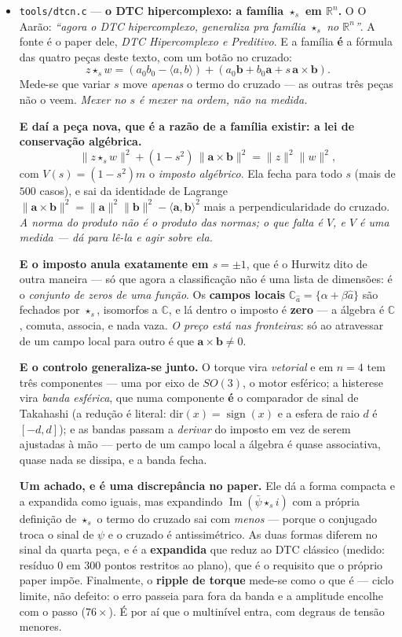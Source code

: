 \documentclass[11pt]{article}
\providecommand{\im}{\operatorname{Im}}
\newcommand{\code}[1]{\texttt{\small #1}}
\newcommand{\R}{\mathbb R}
\newcommand{\C}{\mathbb C}
\theoremstyle{plain}
\theoremstyle{remark}
\begin{document}
\begin{itemize}
\item \code{tools/dtcn.c} --- \textbf{o DTC hipercomplexo: a família $\star_s$ em $\R^n$.} O
O Aarão: \emph{``agora o DTC hipercomplexo, generaliza pra família $\star_s$ no $\R^n$''}. A fonte é o
paper dele, \emph{DTC Hipercomplexo e Preditivo}. E a família \textbf{é} a fórmula das quatro peças
deste texto, com um botão no cruzado:
\[
 z\star_s w = (a_0b_0-\langle a,b\rangle) + (a_0\mathbf b + b_0\mathbf a + s\,\mathbf a\times\mathbf b).
\]
Mede-se que variar $s$ move \emph{apenas} o termo do cruzado --- as outras três peças não o veem.
\emph{Mexer no $s$ é mexer na ordem, não na medida.}

\textbf{E daí a peça nova, que é a razão de a família existir: a lei de conservação algébrica.}
\[
 \|z\star_s w\|^2 + (1-s^2)\,\|\mathbf a\times\mathbf b\|^2 = \|z\|^2\|w\|^2,
\]
com $V(s)=(1-s^2)m$ o \emph{imposto algébrico}. Ela fecha para todo $s$ (mais de $500$ casos), e sai
da identidade de Lagrange $\|\mathbf a\times\mathbf b\|^2=\|\mathbf a\|^2\|\mathbf b\|^2-\langle
\mathbf a,\mathbf b\rangle^2$ mais a perpendicularidade do cruzado. \emph{A norma do produto não é o
produto das normas; o que falta é $V$, e $V$ é uma medida --- dá para lê-la e agir sobre ela.}

\textbf{E o imposto anula exatamente em $s=\pm1$}, que é o Hurwitz dito de outra maneira --- só que
agora a classificação não é uma lista de dimensões: é o \emph{conjunto de zeros de uma função}. Os
\textbf{campos locais} $\C_{\hat a}=\{\alpha+\beta\hat a\}$ são fechados por $\star_s$, isomorfos a
$\C$, e lá dentro o imposto é \textbf{zero} --- a álgebra é $\C$, comuta, associa, e nada vaza.
\emph{O preço está nas fronteiras}: só ao atravessar de um campo local para outro é que $\mathbf
a\times\mathbf b\ne0$.

\textbf{E o controlo generaliza-se junto.} O torque vira \emph{vetorial} e em $n=4$ tem três
componentes --- uma por eixo de $SO(3)$, o motor esférico; a histerese vira \emph{banda esférica},
que numa componente \textbf{é} o comparador de sinal de Takahashi (a redução é literal: $\mathrm
{dir}(x)=\operatorname{sign}(x)$ e a esfera de raio $d$ é $[-d,d]$); e as bandas passam a
\emph{derivar} do imposto em vez de serem ajustadas à mão --- perto de um campo local a álgebra é
quase associativa, quase nada se dissipa, e a banda fecha.

\textbf{Um achado, e é uma discrepância no paper.} Ele dá a forma compacta e a expandida como
iguais, mas expandindo $\im(\bar\psi\star_s i)$ com a própria definição de $\star_s$ o termo do
cruzado sai com \emph{menos} --- porque o conjugado troca o sinal de $\psi$ e o cruzado é
antissimétrico. As duas formas diferem no sinal da quarta peça, e é a \textbf{expandida} que reduz
ao DTC clássico (medido: resíduo $0$ em $300$ pontos restritos ao plano), que é o requisito que o
próprio paper impõe. Finalmente, o \textbf{ripple de torque} mede-se como o que é --- ciclo limite,
não defeito: o erro passeia para fora da banda e a amplitude encolhe com o passo ($76\times$). É por
aí que o multinível entra, com degraus de tensão menores.


\end{itemize}
\end{document}
